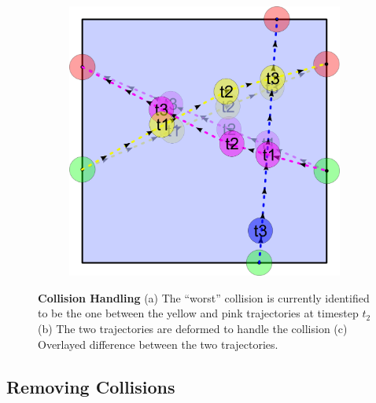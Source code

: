 \begin{figure}[t]
\begin{subfigure}[b]{0.27\linewidth}
		\caption{}
	\end{subfigure}
	~~~~~%
	\begin{subfigure}[b]{0.27\linewidth}
		\includegraphics[width=\linewidth]{./images/collision-2D-example-overlay.png}
		\caption{}
	\end{subfigure}
	\caption{
		\textbf{Collision Handling}
		(a) The ``worst'' collision is currently identified to be the one between the yellow and pink trajectories at timestep $t_2$ 
		(b) The two trajectories are deformed to handle the collision
		(c) Overlayed difference between the two trajectories.  
	}
	\label{fig:collision-removal}
\end{figure}

\subsection{Removing Collisions}
\label{sec:method:remove-collisions}

